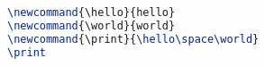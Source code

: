 \documentclass[
    load-dhbw-templates,
    print, %
    add-tocs-to-toc,
    debug,
    language = ngerman
]{iodhbwm}
\begin{document}
    
    \begin{lstlisting}[caption={Hello World},language=TeX]
\newcommand{\hello}{hello}
\newcommand{\world}{world}
\newcommand{\print}{\hello\space\world}
\print
    \end{lstlisting}
    
    \Blinddocument
\end{document}
